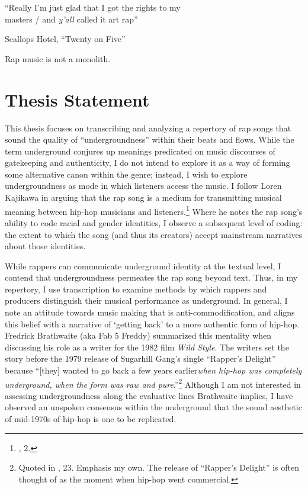 \epigraph{{``Really I'm just glad that I got the rights to my \\ masters / and \emph{y'all} called it art rap\textellipsis''}}{Scallops Hotel, ``Twenty on Five''}

Rap music is not a monolith.

\lipsum[1-3]

\section{Thesis Statement}
This thesis focuses on transcribing and analyzing a repertory of rap songs that sound the quality of ``undergroundness'' within their beats and flows. While the term underground conjures up meanings predicated on music discourses of gatekeeping and authenticity, I do not intend to explore it as a way of forming some alternative canon within the genre; instead, I wish to explore undergroundness as mode in which listeners access the music. I follow Loren Kajikawa in arguing that the rap song is a medium for transmitting musical meaning between hip-hop musicians and listeners.\footnote{\cite{lorenkajikawaSoundingRaceRap2015}, 2.} Where he notes the rap song's ability to code racial and gender identities, I observe a subsequent level of coding: the extent to which the song (and thus its creators) accept mainstream narratives about those identities.

While rappers can communicate underground identity at the textual level, I contend that undergroundness permeates the rap song beyond text. Thus, in my repertory, I use transcription to examine methods by which rappers and producers distinguish their musical performance as underground. In general, I note an attitude towards music making that is anti-commodification, and aligns this belief with a narrative of `getting back' to a more authentic form of hip-hop. Fredrick Brathwaite (aka Fab 5 Freddy) summarized this mentality when discussing his role as a writer for the 1982 film \textit{Wild Style}. The writers set the story before the 1979 release of Sugarhill Gang's single ``Rapper's Delight'' because ``[they] wanted to go back a few years earlier\textellipsis \emph{when hip-hop was completely underground, when the form was raw and pure}.''\footnote{Quoted in \cite{justinawilliamsRhyminStealinMusical2013}, 23. Emphasis my own. The release of ``Rapper's Delight'' is often thought of as the moment when hip-hop went commercial.} Although I am not interested in assessing undergroundness along the evaluative lines Brathwaite implies, I have observed an unspoken consensus within the underground that the sound aesthetic of mid-1970s of hip-hop is one to be replicated.

